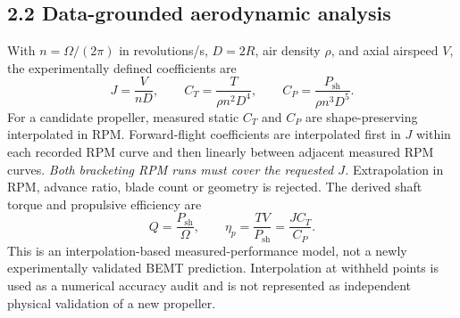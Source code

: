 \documentclass[12pt]{article}
\begin{document}
\subsection*{2.2 Data-grounded aerodynamic analysis}
With $n=\Omega/(2\pi)$ in revolutions/s, $D=2R$, air density $\rho$, and axial airspeed $V$, the experimentally defined coefficients are
\begin{equation}
J=\frac{V}{nD},\qquad C_T=\frac{T}{\rho n^2D^4},\qquad C_P=\frac{P_{\mathrm{sh}}}{\rho n^3D^5}.
\label{eq:coeff}
\end{equation}
For a candidate propeller, measured static $C_T$ and $C_P$ are shape-preserving interpolated in RPM. Forward-flight coefficients are interpolated first in $J$ within each recorded RPM curve and then linearly between adjacent measured RPM curves. \emph{Both bracketing RPM runs must cover the requested $J$.} Extrapolation in RPM, advance ratio, blade count or geometry is rejected. The derived shaft torque and propulsive efficiency are
\begin{equation}
Q=\frac{P_{\mathrm{sh}}}{\Omega},\qquad \eta_p=\frac{TV}{P_{\mathrm{sh}}}=\frac{JC_T}{C_P}.
\end{equation}
This is an interpolation-based measured-performance model, not a newly experimentally validated BEMT prediction. Interpolation at withheld points is used as a numerical accuracy audit and is not represented as independent physical validation of a new propeller.
\end{document}
